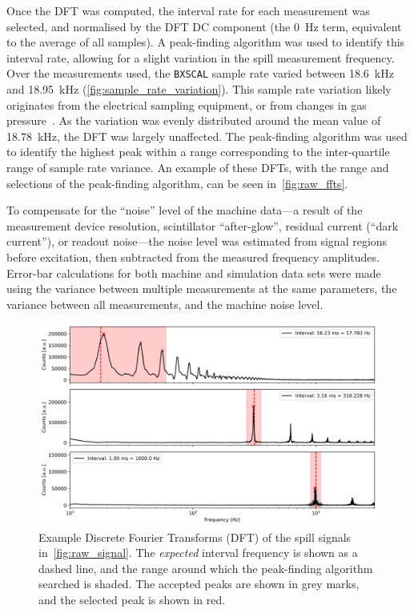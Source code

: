 \documentclass[a4paper,twoside,11pt]{report}
\begin{document}
Once the DFT was computed, the interval rate for each measurement was selected, and normalised by the DFT DC component (the \qty{0}{\hertz} term, equivalent to the average of all samples). A peak-finding algorithm was used to identify this interval rate, allowing for a slight variation in the spill measurement frequency. Over the measurements used, the \verb|BXSCAL| sample rate varied between \qty{18.6}{\kilo\hertz} and \qty{18.95}{\kilo\hertz} (\autoref{fig:sample_rate_variation}). This sample rate variation likely originates from the electrical sampling equipment, or from changes in gas pressure~\cite{PLUM200274}. As the variation was evenly distributed around the mean value of \qty{18.78}{\kilo\hertz}, the DFT was largely unaffected. The peak-finding algorithm was used to identify the highest peak within a range corresponding to the inter-quartile range of sample rate variance. An example of these DFTs, with the range and selections of the peak-finding algorithm, can be seen in~\autoref{fig:raw_ffts}.

To compensate for the ``noise'' level of the machine data---a result of the measurement device resolution, scintillator ``after-glow'', residual current (``dark current''), or readout noise---the noise level was estimated from signal regions before excitation, then subtracted from the measured frequency amplitudes. Error-bar calculations for both machine and simulation data sets were made using the variance between multiple measurements at the same parameters, the variance between all measurements, and the machine noise level.

\begin{figure}
  \centering
  \includegraphics*[width=0.8\linewidth]{raw_ffts.png}
  \caption[Example Fourier transforms of spill signals]{Example Discrete Fourier Transforms (DFT) of the spill signals in~\autoref{fig:raw_signal}. The \textit{expected} interval frequency is shown as a dashed line, and the range around which the peak-finding algorithm searched is shaded. The accepted peaks are shown in grey marks, and the selected peak is shown in red.}\label{fig:raw_ffts}
\end{figure}
\end{document}
